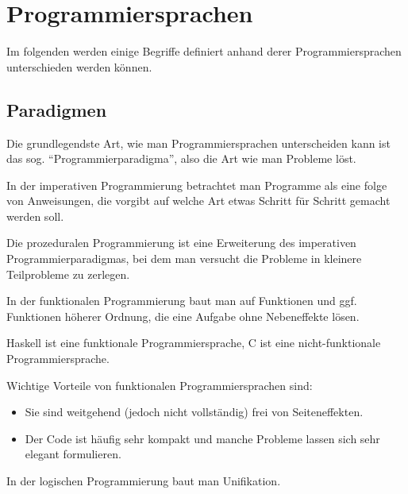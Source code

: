 \chapter{Programmiersprachen}
Im folgenden werden einige Begriffe definiert anhand derer
Programmiersprachen unterschieden werden können.

\section{Paradigmen}
Die grundlegendste Art, wie man Programmiersprachen unterscheiden
kann ist das sog. \enquote{Programmierparadigma}, also die Art wie
man Probleme löst.

\begin{definition}
    In der imperativen Programmierung betrachtet man Programme als
    eine folge von Anweisungen, die vorgibt auf welche Art etwas 
    Schritt für Schritt gemacht werden soll.
\end{definition}

\begin{definition}
    Die prozeduralen Programmierung ist eine Erweiterung des imperativen
    Programmierparadigmas, bei dem man versucht die Probleme in 
    kleinere Teilprobleme zu zerlegen.
\end{definition}

\begin{definition}
    In der funktionalen Programmierung baut man auf Funktionen und
    ggf. Funktionen höherer Ordnung, die eine Aufgabe ohne Nebeneffekte
    lösen.
\end{definition}

Haskell ist eine funktionale Programmiersprache, C ist eine
nicht-funktionale Programmiersprache.

Wichtige Vorteile von funktionalen Programmiersprachen sind:
\begin{itemize}
    \item Sie sind weitgehend (jedoch nicht vollständig) frei von Seiteneffekten.
    \item Der Code ist häufig sehr kompakt und manche Probleme lassen
          sich sehr elegant formulieren.
\end{itemize}

\begin{definition}
    In der logischen Programmierung baut man Unifikation.
\end{definition}

